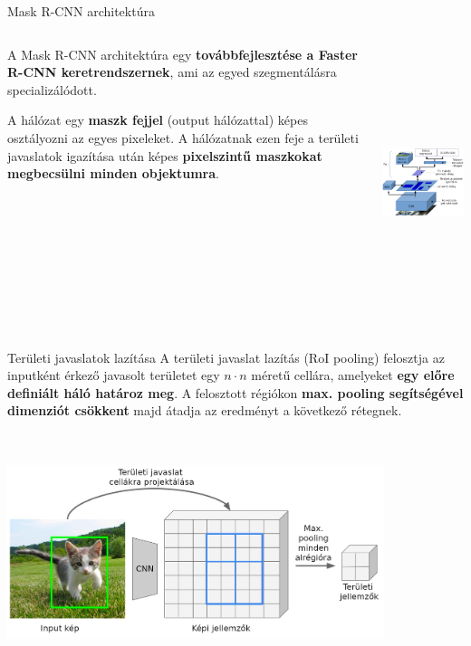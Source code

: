 \documentclass[english, aspectratio=169]{beamer}
\begin{document}
\begin{frame}{Mask R-CNN architektúra}
\begin{columns}
\begin{column}{.4\textwidth}
A Mask R-CNN architektúra egy \textbf{továbbfejlesztése a Faster R-CNN keretrendszernek}, ami az egyed szegmentálásra specializálódott.\par\smallskip
A hálózat egy \textbf{maszk fejjel} (output hálózattal) képes osztályozni az egyes pixeleket. A hálózatnak ezen feje a területi javaslatok igazítása után képes \textbf{pixelszintű maszkokat megbecsülni minden objektumra}.
\end{column}
\begin{column}{.6\textwidth}
\begin{center}
\includegraphics[height=8cm, width=8cm, keepaspectratio]{images/instance_17.png}
\end{center}
\end{column}
\end{columns}
\end{frame}

\begin{frame}{Területi javaslatok lazítása}
A területi javaslat lazítás (RoI pooling) felosztja az inputként érkező javasolt területet egy $n \cdot n$ méretű cellára, amelyeket \textbf{egy előre definiált háló határoz meg}. A felosztott régiókon \textbf{max. pooling segítségével dimenziót csökkent} majd átadja az eredményt a következő rétegnek.
\begin{center}
\includegraphics[height=7cm, width=11cm, keepaspectratio]{images/instance_18.png}
\end{center}
\end{frame}
\end{document}
